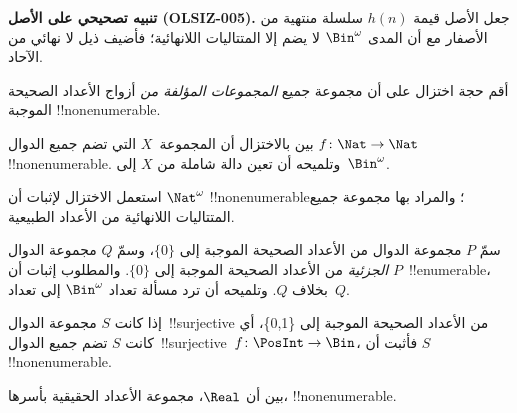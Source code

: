 \documentclass[../../../include/open-logic-section]{subfiles}
\begin{document}
\begin{editorial}
\textbf{تنبيه تصحيحي على الأصل (OLSIZ-005).}
جعل الأصل قيمة $h(n)$ سلسلة منتهية من الأصفار مع أن المدى
$\Bin^\omega$ لا يضم إلا المتتاليات اللانهائية؛ فأضيف ذيل لا نهائي من الآحاد.
\end{editorial}

\begin{prob}
أقم حجة اختزال على أن مجموعة جميع \emph{المجموعات المؤلفة من} أزواج الأعداد الصحيحة الموجبة !!{nonenumerable}.
\end{prob}

\begin{prob}\label{sfr:siz:red:prob:nat-nat}
بين بالاختزال أن المجموعة~$X$ التي تضم جميع الدوال $f\colon \Nat \to \Nat$ !!{nonenumerable}. وتلميحه أن تعين دالة شاملة من $X$ إلى~$\Bin^\omega$.
\end{prob}

\begin{prob}
استعمل الاختزال لإثبات أن $\Nat^\omega$ !!{nonenumerable}؛ والمراد بها مجموعة جميع المتتاليات اللانهائية من الأعداد الطبيعية.
\end{prob}

\begin{prob}
سمّ $P$ مجموعة الدوال من الأعداد الصحيحة الموجبة إلى $\{0\}$، وسمّ $Q$ مجموعة الدوال \emph{الجزئية} من الأعداد الصحيحة الموجبة إلى $\{0\}$. والمطلوب إثبات أن $P$~!!{enumerable}، بخلاف $Q$. وتلميحه أن ترد مسألة تعداد $\Bin^\omega$ إلى تعداد~$Q$.
\end{prob}

\begin{prob}
إذا كانت $S$ مجموعة الدوال~!!{surjective} من الأعداد الصحيحة الموجبة إلى \{0,1\}، أي كانت $S$ تضم جميع الدوال~!!{surjective}~$f\colon \PosInt \to \Bin$، فأثبت أن $S$ !!{nonenumerable}.
\end{prob}

\begin{prob}
بين أن $\Real$، مجموعة الأعداد الحقيقية بأسرها، !!{nonenumerable}.
\end{prob}
\end{document}
